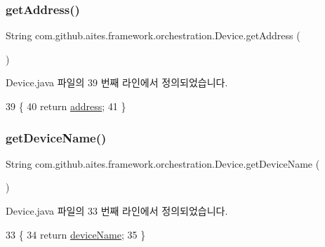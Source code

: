 \subsubsection{\texorpdfstring{get\+Address()}{getAddress()}}
{\footnotesize\ttfamily String com.\+github.\+aites.\+framework.\+orchestration.\+Device.\+get\+Address (\begin{DoxyParamCaption}{ }\end{DoxyParamCaption})}



Device.\+java 파일의 39 번째 라인에서 정의되었습니다.


\begin{DoxyCode}
39                               \{
40         \textcolor{keywordflow}{return} \mbox{\hyperlink{classcom_1_1github_1_1aites_1_1framework_1_1orchestration_1_1_device_a81329ac5d638ae2e569595efd92a4fe4}{address}};
41     \}
\end{DoxyCode}
\mbox{\label{classcom_1_1github_1_1aites_1_1framework_1_1orchestration_1_1_device_a8ad5140ca72895750560fd3e575c61e0}} 
\subsubsection{\texorpdfstring{get\+Device\+Name()}{getDeviceName()}}
{\footnotesize\ttfamily String com.\+github.\+aites.\+framework.\+orchestration.\+Device.\+get\+Device\+Name (\begin{DoxyParamCaption}{ }\end{DoxyParamCaption})}



Device.\+java 파일의 33 번째 라인에서 정의되었습니다.


\begin{DoxyCode}
33                                  \{
34         \textcolor{keywordflow}{return} \mbox{\hyperlink{classcom_1_1github_1_1aites_1_1framework_1_1orchestration_1_1_device_aa4746e20c5c8b51170b4ada37295f69e}{deviceName}};
35     \}
\end{DoxyCode}
\mbox{\label{classcom_1_1github_1_1aites_1_1framework_1_1orchestration_1_1_device_a7ff83e350feda0e74d226235c236d283}} 
